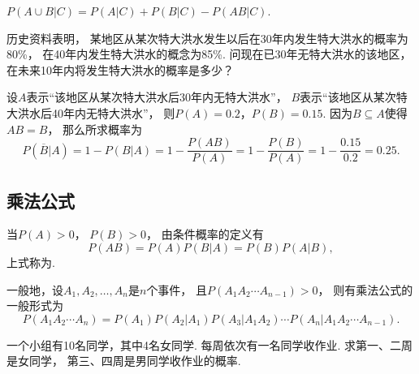 \begin{property}
\(P(A \cup B \vert C)
= P(A \vert C) + P(B \vert C) - P(AB \vert C)\).
\end{property}

\begin{example}
历史资料表明，
某地区从某次特大洪水发生以后在30年内发生特大洪水的概率为80\%，
在40年内发生特大洪水的概念为85\%.
问现在已30年无特大洪水的该地区，
在未来10年内将发生特大洪水的概率是多少？
\begin{solution}
设\(A\)表示“该地区从某次特大洪水后30年内无特大洪水”，
\(B\)表示“该地区从某次特大洪水后40年内无特大洪水”，
则\(P(A) = 0.2\)，\(P(B) = 0.15\).
因为\(B \subseteq A\)使得\(AB = B\)，
那么所求概率为\[
	P(\overline{B} \vert A)
	= 1 - P(B \vert A)
	= 1 - \frac{P(AB)}{P(A)}
	= 1 - \frac{P(B)}{P(A)}
	= 1 - \frac{0.15}{0.2}
	= 0.25.
\]
\end{solution}
\end{example}

\subsection{乘法公式}
\begin{theorem}[概率的乘法]
当\(P(A) > 0\)，
\(P(B) > 0\)，
由条件概率的定义有\begin{equation}
	P(AB) = P(A) P(B \vert A) = P(B) P(A \vert B),
\end{equation}
上式称为.

一般地，设\(A_1,A_2,\dotsc,A_n\)是\(n\)个事件，
且\(P(A_1 A_2 \dotsm A_{n-1}) > 0\)，
则有乘法公式的一般形式为\begin{equation}
	P(A_1 A_2 \dotsm A_n)
	= P(A_1) P(A_2 \vert A_1) P(A_3 \vert A_1 A_2) \dotsm P(A_n \vert A_1 A_2 \dotsm A_{n-1}).
\end{equation}
\end{theorem}

\begin{example}
一个小组有10名同学，其中4名女同学.
每周依次有一名同学收作业.
求第一、二周是女同学，
第三、四周是男同学收作业的概率.
\end{example}

